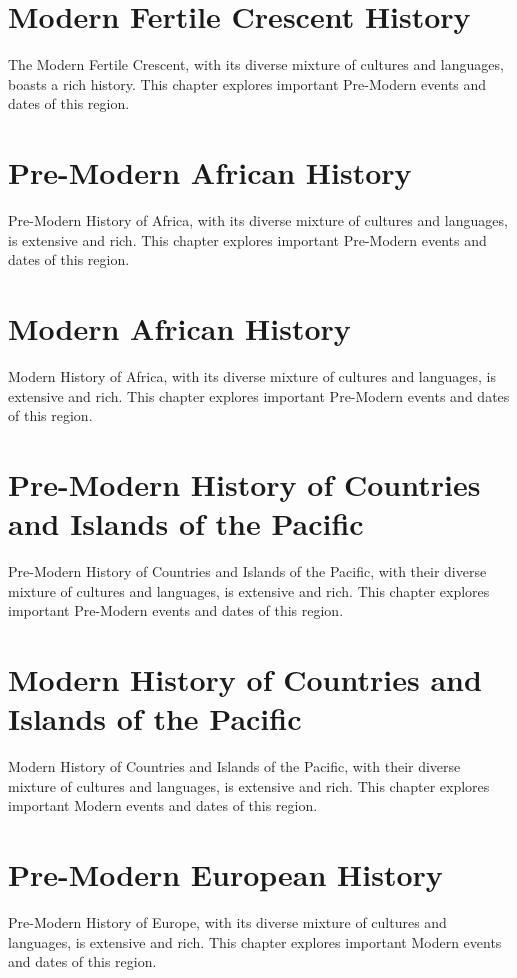 \documentclass[a4paper,12pt]{book}
\begin{document}
\chapter{Modern Fertile Crescent History}
The Modern Fertile Crescent, with its diverse mixture of cultures and languages, boasts a rich history.  This chapter explores important Pre-Modern events and dates of this region.

\chapter{Pre-Modern African History}
Pre-Modern History of Africa, with its diverse mixture of cultures and languages, is extensive and rich. This chapter explores important Pre-Modern events and dates of this region.

\chapter{Modern African History}
Modern History of Africa, with its diverse mixture of cultures and languages, is extensive and rich. This chapter explores important Pre-Modern events and dates of this region.

\chapter{Pre-Modern History of Countries and Islands of the Pacific}
Pre-Modern History of Countries and Islands of the Pacific, with their diverse mixture of cultures and languages, is extensive and rich. This chapter explores important Pre-Modern events and dates of this region.

\chapter{Modern History of Countries and Islands of the Pacific}
Modern History of Countries and Islands of the Pacific, with their diverse mixture of cultures and languages, is extensive and rich. This chapter explores important Modern events and dates of this region.

\chapter{Pre-Modern European History}
Pre-Modern History of Europe, with its diverse mixture of cultures and languages, is extensive and rich. This chapter explores important Modern events and dates of this region.
\end{document}

